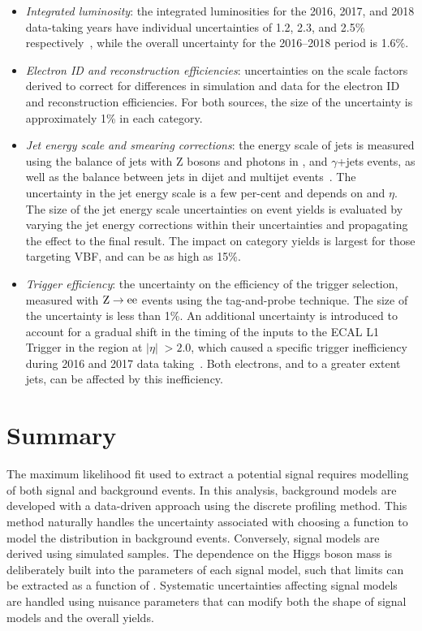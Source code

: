 \begin{itemize}
\item \textit{Integrated luminosity}:
  the integrated luminosities for the 2016, 2017, and 2018 data-taking years have individual uncertainties of 1.2, 2.3, and 2.5\% respectively~\cite{CMSlumi2016,CMSlumi2017,CMSlumi2018}, while the overall uncertainty for the 2016--2018 period is 1.6\%. 
\item \textit{Electron ID and reconstruction efficiencies}:
  uncertainties on the scale factors derived to correct for differences in simulation and data for the electron ID and reconstruction efficiencies. For both sources, the size of the uncertainty is approximately 1\% in each category.
\item \textit{Jet energy scale and smearing corrections}:
  the energy scale of jets is measured using the \pt balance of jets with $\mathrm{Z}$ bosons and photons in \Zee, \Zmumu and $\gamma$+jets events, as well as the \pt balance between jets in dijet and multijet events~\cite{JetsInRun2}.
  The uncertainty in the jet energy scale is a few per-cent and depends on \pt and $\eta$.
  The size of the jet energy scale uncertainties on event yields is evaluated by varying the jet energy corrections within their uncertainties and propagating the effect to the final result. The impact on category yields is largest for those targeting VBF, and can be as high as 15\%.
\item \textit{Trigger efficiency}:
  the uncertainty on the efficiency of the trigger selection, measured with $\mathrm{Z}\rightarrow{\mathrm{e}\mathrm{e}}$ events using the tag-and-probe technique. The size of the uncertainty is less than 1\%. An additional uncertainty is introduced to account for a gradual shift in the timing of the inputs to the ECAL L1 Trigger in the region at $|\eta|\; > 2.0$, which caused a specific trigger inefficiency during 2016 and 2017 data taking~\cite{CMS_L1T}. Both electrons, and to a greater extent jets, can be affected by this inefficiency.
\end{itemize} 

\section{Summary}
The maximum likelihood fit used to extract a potential \Hee signal requires modelling of both signal and background events. In this analysis, background models are developed with a data-driven approach using the discrete profiling method. This method naturally handles the uncertainty associated with choosing a function to model the \mee distribution in background events. Conversely, signal models are derived using simulated samples. The dependence on the Higgs boson mass is deliberately built into the parameters of each signal model, such that limits can be extracted as a function of \mH. Systematic uncertainties affecting signal models are handled using nuisance parameters that can modify both the shape of signal models and the overall yields. 